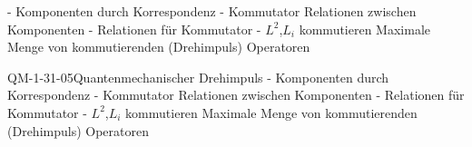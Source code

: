 - Komponenten durch Korrespondenz
- Kommutator Relationen zwischen Komponenten
- Relationen für Kommutator
- $L^2$,$L_i$ kommutieren
Maximale Menge von kommutierenden (Drehimpuls) Operatoren

\begin{REM}{QM-1-31-05}{Quantenmechanischer Drehimpuls
- Komponenten durch Korrespondenz
- Kommutator Relationen zwischen Komponenten
- Relationen für Kommutator
- $L^2$,$L_i$ kommutieren
Maximale Menge von kommutierenden (Drehimpuls) Operatoren}
\end{REM}
